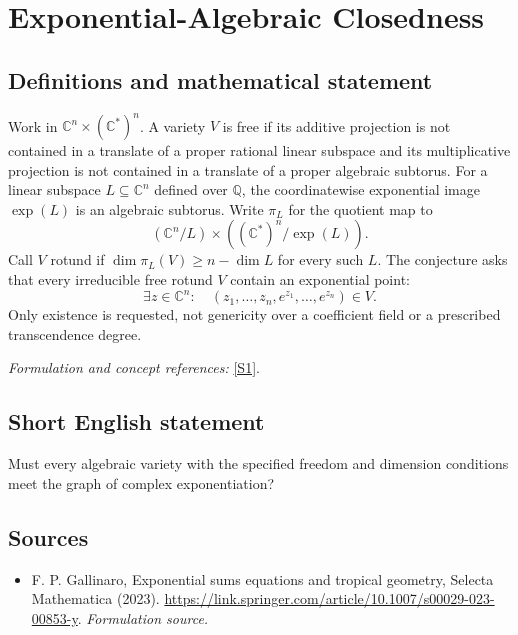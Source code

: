\documentclass[11pt]{article}
\begin{document}
\section*{\texorpdfstring{Exponential-Algebraic Closedness}{Exponential-Algebraic Closedness}}\label{30005291}
\subsection{Definitions and mathematical statement}
Work in ${\mathbb{C}}^n\times({\mathbb{C}}^*)^n$. A variety $V$ is free if its additive projection is not contained in a translate of a proper rational linear subspace and its multiplicative projection is not contained in a translate of a proper algebraic subtorus. For a linear subspace $L\subseteq{\mathbb{C}}^n$ defined over ${\mathbb{Q}}$, the coordinatewise exponential image $\exp(L)$ is an algebraic subtorus. Write $\pi_L$ for the quotient map to
\[
 ({\mathbb{C}}^n/L)\times(({\mathbb{C}}^*)^n/\exp(L)).
\]
Call $V$ rotund if $\dim\pi_L(V)\ge n-\dim L$ for every such $L$. The conjecture asks that every irreducible free rotund $V$ contain an exponential point:
\[
 \exists z\in{\mathbb{C}}^n:\quad (z_1,\ldots,z_n,e^{z_1},\ldots,e^{z_n})\in V.
\]
Only existence is requested, not genericity over a coefficient field or a prescribed transcendence degree.
\par\smallskip\textit{Formulation and concept references:} \href{https://link.springer.com/article/10.1007/s00029-023-00853-y}{[S1]}.

\subsection{Short English statement}
Must every algebraic variety with the specified freedom and dimension conditions meet the graph of complex exponentiation?
\subsection{Sources}
\begin{itemize}
\item[S1]F. P. Gallinaro, Exponential sums equations and tropical geometry, Selecta Mathematica (2023).
\url{https://link.springer.com/article/10.1007/s00029-023-00853-y}.
\textit{Formulation source.}
\end{itemize}
\end{document}
